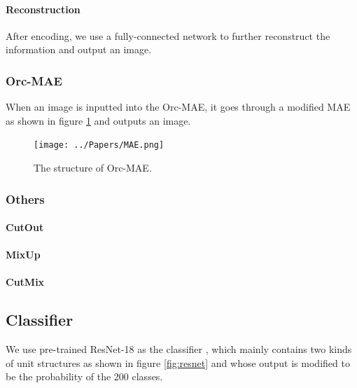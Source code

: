 \documentclass{article}
\begin{document}
\paragraph{Reconstruction}
After encoding, we use a fully-connected network to further reconstruct the information and output an image.

\subsubsection{Orc-MAE}

When an image is inputted into the Orc-MAE, it goes through a modified MAE as shown in figure \ref{fig:MAE} and outputs an image.

\begin{figure}[p]
	\centering
	\texttt{[image: ../Papers/MAE.png]}
	\caption{The structure of Orc-MAE.}
	\label{fig:MAE}
\end{figure}

\subsubsection{Others}

\paragraph{CutOut}

\paragraph{MixUp}

\paragraph{CutMix}

\subsection{Classifier}

We use pre-trained ResNet-18 as the classifier \citep{ResNet}, which mainly contains two kinds of unit structures as shown in figure \ref{fig:resnet} and whose output is modified to be the probability of the 200 classes.
\end{document}
